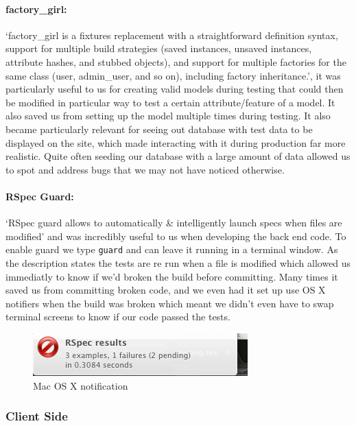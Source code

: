     \paragraph{factory\_girl:}
      `factory\_girl is a fixtures replacement with a straightforward definition syntax, support for multiple build strategies (saved instances, unsaved instances, attribute hashes, and stubbed objects), and support for multiple factories for the same class (user, admin\_user, and so on), including factory inheritance.'\cite{factory-girl}, it was particularly useful to us for creating valid models during testing that could then be modified in particular way to test a certain attribute/feature of a model.
      It also saved us from setting up the model multiple times during testing.
      It also became particularly relevant for seeing out database with test data to be displayed on the site, which made interacting with it during production far more realistic. Quite often seeding our database with a large amount of data allowed us to spot and address bugs that we may not have noticed otherwise.

    \paragraph{RSpec Guard:}
      `RSpec guard allows to automatically \& intelligently launch specs when files are modified'\cite{guard} and was incredibly useful to us when developing the back end code. To enable guard we type \verb!guard! and can leave it running in a terminal window. As the description states the tests are re run when a file is modified which allowed us immediatly to know if we'd broken the build before committing.
      Many times it saved us from committing broken code, and we even had it set up use OS X notifiers when the build was broken which meant we didn't even have to swap terminal screens to know if our code passed the tests.

      \begin{figure}[H]\centering
      \includegraphics[scale=0.5]{images/project_management/testing/guard_osx}
      \caption{Mac OS X notification}
      \end{figure}

  \subsubsection{Client Side}
